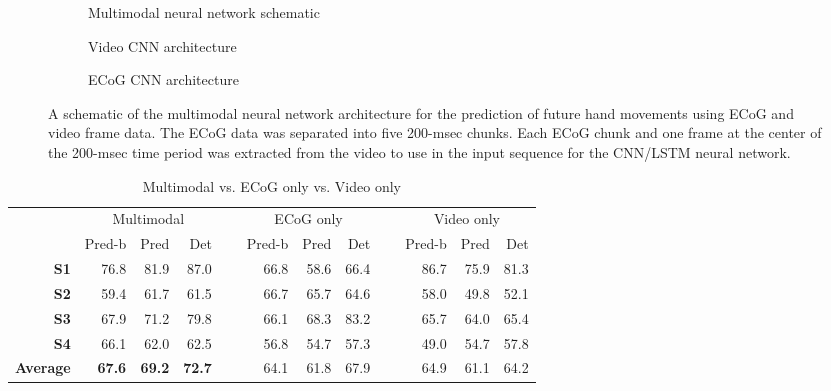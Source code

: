 \documentclass[letterpaper]{article} %
\begin{document}
\begin{figure}[h!]
\begin{subfigure}{0.47\textwidth}
\caption{Multimodal neural network schematic}
\end{subfigure}

\begin{subfigure}{0.47\textwidth}
\caption{Video CNN architecture}
\end{subfigure}

\begin{subfigure}{0.47\textwidth}
\caption{ECoG CNN architecture}
\end{subfigure}


\caption{A schematic of the multimodal neural network architecture for the prediction of future hand movements using ECoG and video frame data. The ECoG data was separated into five 200-msec chunks. Each ECoG chunk and one frame at the center of the 200-msec time period was extracted from the video to use in the input sequence for the CNN/LSTM neural network.
\label{fig:architecture}}
\end{figure}






\begin{table*}[h]
\centering
\caption{Multimodal vs. ECoG only vs. Video only
\label{tab:modalities}
}
\begin{tabular}{@{}rrrrrrrrrrrr@{}}
\toprule
& \multicolumn{3}{c}{Multimodal} &~& \multicolumn{3}{c}{ECoG only} &~& \multicolumn{3}{c}{Video only} \\
& Pred-b & Pred & Det && Pred-b & Pred & Det && Pred-b & Pred & Det \\
\cmidrule{2-4} \cmidrule{6-8} \cmidrule{10-12} 
\textbf{S1}        & 76.8  & 81.9 & 87.0 && 66.8 & 58.6 & 66.4 && 86.7 & 75.9 & 81.3\\ 
\textbf{S2}        & 59.4  & 61.7 & 61.5 && 66.7 & 65.7 & 64.6 && 58.0 & 49.8 & 52.1\\ 
\textbf{S3}        & 67.9  & 71.2 & 79.8 && 66.1 & 68.3 & 83.2 && 65.7 & 64.0 & 65.4\\  
\textbf{S4}        & 66.1  & 62.0 & 62.5 && 56.8 & 54.7 & 57.3 && 49.0 & 54.7 & 57.8\\ 
\cmidrule{2-4} \cmidrule{6-8} \cmidrule{10-12} 

\textbf{Average}   & \textbf{67.6}  & \textbf{69.2} & \textbf{72.7} && 64.1 & 61.8 & 67.9 && 64.9 & 61.1 & 64.2 \\
\bottomrule
\end{tabular}
\end{table*}
\end{document}
